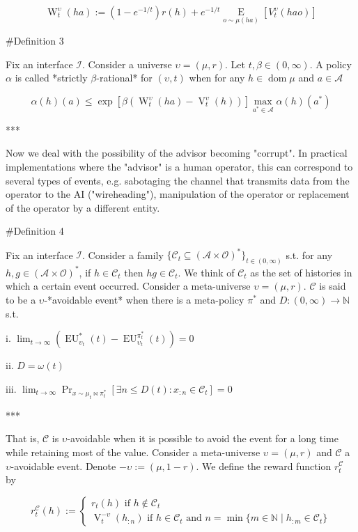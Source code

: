 \documentclass[a4paper]{article}
\DeclareMathOperator{\Dom}{dom}
\newcommand{\E}[1]{\underset{#1}{\operatorname{E}}}
\newcommand{\Nats}{\mathbb{N}}
\newcommand{\Ob}{\mathcal{O}}
\newcommand{\A}{\mathcal{A}}
\newcommand{\I}{\mathcal{I}}
\newcommand{\FH}{(\A \times \Ob)^*}
\newcommand{\Co}{\mathcal{C}}
\newcommand{\V}{\operatorname{V}}
\newcommand{\W}{\operatorname{W}}
\newcommand{\EU}{\operatorname{EU}}
\begin{document}
$$\W_t^\upsilon(ha):=(1-e^{-1/t})r(h)+e^{-1/t}\E{o \sim \mu(ha)}[V_t^\upsilon(hao)]$$

\#Definition 3

Fix an interface $\I$. Consider a universe $\upsilon=(\mu,r)$. Let $t,\beta \in (0,\infty)$. A policy $\alpha$ is called *strictly $\beta$-rational* for $(\upsilon,t)$ when for any $h \in \Dom{\mu}$ and $a \in \A$

$$\alpha(h)(a) \leq \exp{[\beta(\W^{\upsilon}_t(ha)-\V^\upsilon_t(h))]} \max_{a^* \in \A} \alpha(h)(a^*)$$

***

Now we deal with the possibility of the advisor becoming "corrupt". In practical implementations where the "advisor" is a human operator, this can correspond to several types of events, e.g. sabotaging the channel that transmits data from the operator to the AI ("wireheading"), manipulation of the operator or replacement of the operator by a different entity.

\#Definition 4

Fix an interface $\I$. Consider a family $\{\Co_t \subseteq \FH \}_{t \in (0,\infty)}$ s.t. for any $h,g \in \FH$, if $h \in \Co_t$ then $hg \in \Co_t$. We think of $\Co_t$ as the set of histories in which a certain event occurred. Consider a meta-universe $\upsilon=(\mu,r)$. $\Co$ is said to be a $\upsilon$-*avoidable event* when there is a meta-policy $\pi^*$ and $D: (0,\infty) \rightarrow \Nats$ s.t.

i. $\lim_{t \rightarrow \infty} {(\EU_{\upsilon_t}^{*}(t)-\EU_{\upsilon_t}^{\pi^*_t}(t))} = 0$

ii. $D = \omega(t)$

iii. $\lim_{t \rightarrow \infty} \Pr_{x \sim \mu_t\bowtie\pi^*_t}[\exists n \leq D(t): x_{:n} \in \Co_t] = 0$

***

That is, $\Co$ is $\upsilon$-avoidable when it is possible to avoid the event for a long time while retaining most of the value. Consider a meta-universe $\upsilon=(\mu,r)$ and $\Co$ a $\upsilon$-avoidable event. Denote $-\upsilon:=(\mu,1-r)$. We define the reward function $r^\Co_t$ by

$$r^\Co_t(h):=\begin{cases} r_t(h) \text{ if } h \not\in \Co_t \\ \V^{-\upsilon}_t(h_{:n}) \text{ if } h \in \Co_t \text{ and } n = \min\{m \in \Nats \mid h_{:m} \in \Co_t\}\end{cases}$$
\end{document}
